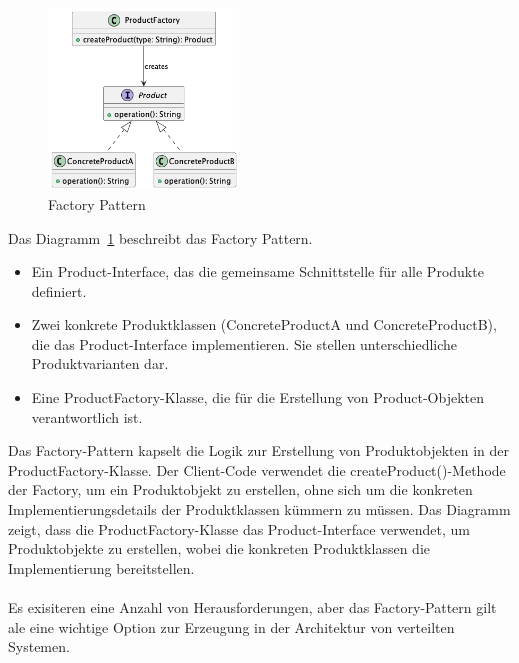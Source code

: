 \documentclass[../vs-script-first-v01.tex]{subfiles}
\begin{document}
\begin{figure}[!ht]
  \centering
  \includegraphics[width=0.45\textwidth]{fig/uml/factory-class.png}
  \caption{Factory Pattern}
  \label{fig:factory-class}
\end{figure}
Das Diagramm~\ref{fig:factory-class} beschreibt das Factory Pattern.
\begin{itemize}
\item Ein Product-Interface, das die gemeinsame Schnittstelle für alle Produkte definiert.
\item Zwei konkrete Produktklassen (ConcreteProductA und ConcreteProductB), die das Product-Interface implementieren. Sie stellen unterschiedliche Produktvarianten dar.
\item Eine ProductFactory-Klasse, die für die Erstellung von Product-Objekten verantwortlich ist.
\end{itemize}
Das Factory-Pattern kapselt die Logik zur Erstellung von Produktobjekten in der ProductFactory-Klasse. Der Client-Code verwendet die createProduct()-Methode der Factory, um ein Produktobjekt zu erstellen, ohne sich um die konkreten Implementierungsdetails der Produktklassen kümmern zu müssen. Das Diagramm zeigt, dass die ProductFactory-Klasse das Product-Interface verwendet, um Produktobjekte zu erstellen, wobei die konkreten Produktklassen die Implementierung bereitstellen.
\\\\
Es exisiteren eine Anzahl von Herausforderungen, aber das Factory-Pattern gilt ale eine wichtige Option zur Erzeugung in der Architektur von verteilten Systemen.
\end{document}
